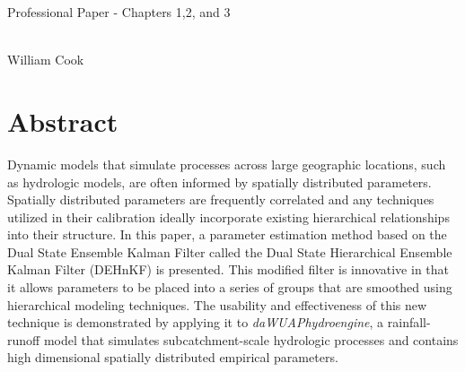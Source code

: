 \documentclass[12pt,twoside]{mitthesis}
\begin{document}
\pagestyle{plain}

\vspace*{\fill}
\begin{center}
\begin{LARGE}
Professional Paper - Chapters 1,2, and 3
\end{LARGE}
\\
{\large William Cook}
\end{center}
\vspace*{\fill}
\pagebreak

\section{Abstract}



Dynamic models that simulate processes across large geographic locations, such as hydrologic models, are often informed by spatially distributed parameters. Spatially distributed parameters are frequently correlated and any techniques utilized in their calibration ideally incorporate existing hierarchical relationships into their structure. In this paper, a parameter estimation method based on the Dual State Ensemble Kalman Filter called the Dual State Hierarchical Ensemble Kalman Filter (DEHnKF) is presented. This modified filter is innovative in that it allows parameters to be placed into a series of groups that are smoothed using hierarchical modeling techniques. The usability and effectiveness of this new technique is demonstrated by applying it to \textit{daWUAPhydroengine}, a rainfall-runoff model that simulates subcatchment-scale hydrologic processes and contains high dimensional spatially distributed empirical parameters.






\appendix



\end{document}

